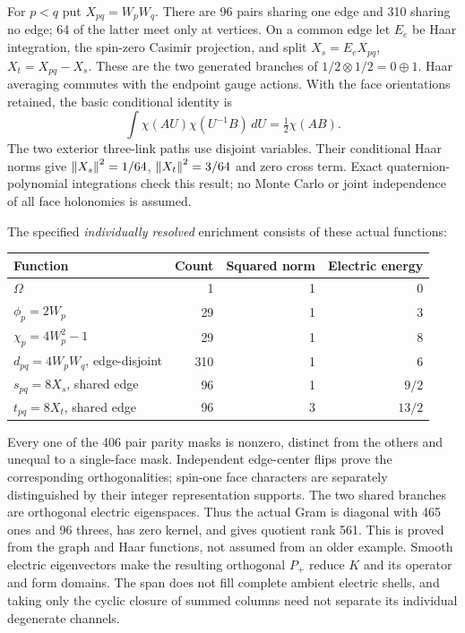 For $p<q$ put $X_{pq}=W_pW_q$. There are 96 pairs sharing one edge and 310 sharing no edge; 64 of the latter meet only at vertices. On a common edge let $E_e$ be Haar integration, the spin-zero Casimir projection, and split $X_s=E_eX_{pq}$, $X_t=X_{pq}-X_s$. These are the two generated branches of $1/2\otimes1/2=0\oplus1$. Haar averaging commutes with the endpoint gauge actions. With the face orientations retained, the basic conditional identity is
\begin{equation}
 \int\chi(AU)\chi(U^{-1}B)\,dU=\tfrac12\chi(AB).
 \label{eq:ah1-haar}
\end{equation}
The two exterior three-link paths use disjoint variables. Their conditional Haar norms give $\left\lVert X_s\right\rVert^2=1/64$, $\left\lVert X_t\right\rVert^2=3/64$ and zero cross term. Exact quaternion-polynomial integrations check this result; no Monte Carlo or joint independence of all face holonomies is assumed.

The specified \emph{individually resolved} enrichment consists of these actual functions:
\begin{center}\small
\begin{tabular}{@{}lrrr@{}}\toprule
Function & Count & Squared norm & Electric energy\\\midrule
$\Omega$&1&1&0\\
$\phi_p=2W_p$&29&1&3\\
$\chi_p=4W_p^2-1$&29&1&8\\
$d_{pq}=4W_pW_q$, edge-disjoint&310&1&6\\
$s_{pq}=8X_s$, shared edge&96&1&$9/2$\\
$t_{pq}=8X_t$, shared edge&96&3&$13/2$\\\bottomrule
\end{tabular}
\end{center}
Every one of the 406 pair parity masks is nonzero, distinct from the others and unequal to a single-face mask. Independent edge-center flips prove the corresponding orthogonalities; spin-one face characters are separately distinguished by their integer representation supports. The two shared branches are orthogonal electric eigenspaces. Thus the actual Gram is diagonal with 465 ones and 96 threes, has zero kernel, and gives quotient rank 561. This is proved from the graph and Haar functions, not assumed from an older example. Smooth electric eigenvectors make the resulting orthogonal $P_+$ reduce $K$ and its operator and form domains. The span does not fill complete ambient electric shells, and taking only the cyclic closure of summed columns need not separate its individual degenerate channels.

